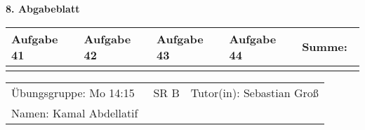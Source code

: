 \documentclass[a4paper, 12pt]{scrartcl}
\begin{document}
\begin{center}
    \textbf{8. Abgabeblatt}\\[2em]
	\def\arraystretch{2}
    \begin{tabular}{|l|l|l|l||p{18mm}|}
        \hline
        Aufgabe 41 & Aufgabe 42 & Aufgabe 43 & Aufgabe 44 & Summe:~ \\
        \hline &&&&\\
         \hline  
    \end{tabular}
\end{center}
\begingroup
\def\arraystretch{1.5}
\begin{tabular}{p{}p{}}
	\hline
    Übungsgruppe: Mo 14:15 ~~ SR B& Tutor(in): Sebastian Groß\\
    Namen: Kamal Abdellatif &\\
    \hline
\end{tabular}
\endgroup\\
\end{document}
